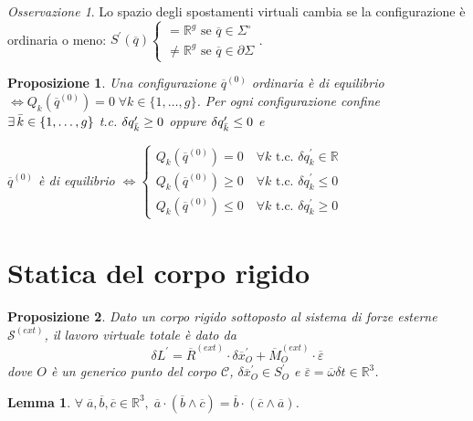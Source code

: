 \documentclass{book}
\theoremstyle{plain}
\theoremstyle{plain}
\newtheorem*{lemma}{Lemma}
\theoremstyle{plain}
\theoremstyle{plain}
\theoremstyle{plain}
\newtheorem{prop}{Proposizione}[chapter]
\theoremstyle{definition}
\theoremstyle{remark}
\newtheorem*{oss}{Osservazione}
\theoremstyle{definition}
\begin{document}
\begin{oss}
    Lo spazio degli spostamenti virtuali cambia se la configurazione è ordinaria o meno: $S^{\prime}(\overline{q})
    \begin{cases}
         =\mathbb{R}^{g} \text { se } \overline{q} \in \Sigma^{\circ} \\
         \neq \mathbb{R}^{g} \text { se } \overline{q} \in \partial \Sigma
    \end{cases}$.
\end{oss}
\begin{prop}
    Una configurazione $\overline{q}^{(0)}$ ordinaria è di equilibrio $\iff Q_{k}\left(\overline{q}^{(0)}\right)=0 \;\forall k \in \{1, \ldots, g\}$. Per ogni configurazione confine $\exists \, \Bar{k} \in\{1, \ldots, g\}$ t.c. $\delta q_{\Bar{k}}^{\prime} \geq 0$ oppure $\delta q_{\Bar{k}}^{\prime} \leq 0$ e
    
    \noindent $\overline{q}^{(0)}$ è di equilibrio $\iff
    \begin{cases}
        Q_{k}\left(\overline{q}^{(0)}\right)=0 \quad \forall k \text { t.c. } \delta q_{k}^{\prime} \in \mathbb{R} \\
        Q_{k}\left(\overline{q}^{(0)}\right) \geq 0 \quad \forall k \text { t.c. } \delta q_{k}^{\prime} \leq 0 \\
        Q_{k}\left(\overline{q}^{(0)}\right) \leq 0 \quad \forall k \text { t.c. } \delta q_{k}^{\prime} \geq 0
    \end{cases}$ 
\end{prop}

\section{Statica del corpo rigido}

\begin{prop}
    Dato un corpo rigido sottoposto al sistema di forze esterne $\mathcal{S}^{(ext)}$, il lavoro virtuale totale è dato da
    \begin{displaymath}
    \boxed{
        \delta L^{\prime}=\overline{R}^{(ext)} \cdot \delta \overline{x}_{O}^{\prime}+\overline{M}_{O}^{(ext)} \cdot \overline{\varepsilon}
        }
    \end{displaymath}
    dove $O$ è un generico punto del corpo $\mathcal{C}$, $\delta \overline{x}_O^{\prime} \in S_O^{\prime}$ e $\overline{\varepsilon}=\overline{\omega} \delta t \in \mathbb{R}^{3}$.
\end{prop}

\begin{lemma}
    $\forall \; \overline{a}, \overline{b}, \overline{c}\in\mathbb{R}^3, \;\overline{a}\cdot(\overline{b}\wedge\overline{c})=\overline{b}\cdot(\overline{c}\wedge\overline{a})$.
\end{lemma}
\end{document}
